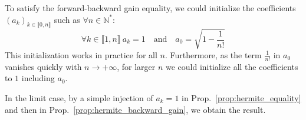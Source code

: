 \documentclass{article} %
\theoremstyle{plain}
\theoremstyle{definition}
\theoremstyle{remark}
\begin{document}
To satisfy the forward-backward gain equality, we could initialize the coefficients $(a_k)_{k \in  \llbracket 0,n \rrbracket}$ such as $\forall n \in \mathbb{N}^*$:
\begin{equation}
     \forall k \in   \llbracket 1,n \rrbracket \ a_k = 1 \quad\text{and}\quad a_0 = \sqrt{1 - \frac{1}{n!}}
\end{equation}
This initialization works in practice for all $n$. Furthermore, as the term $\frac{1}{n!}$ in $a_0$ vanishes quickly with $n \rightarrow +\infty$, for larger $n$ we could initialize all the coefficients to $1$ including $a_0$.

In the limit case, by a simple injection of $a_k = 1$ in Prop.~\ref{prop:hermite_equality} and then in Prop.~\ref{prop:hermite_backward_gain}, we obtain the result.
\end{document}
